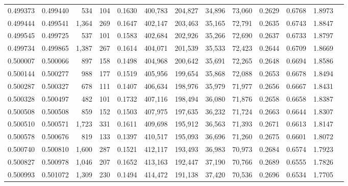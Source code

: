 \begin{tabular}{rrrrrrrrrrrrr}
0.499373 & 0.499440 &   534 &   104 &                                     0.1630 & 400,783 & 204,827 &  34,896 &  73,060 & 0.2629 & 0.6768 & 1.8973 \\
0.499444 & 0.499541 & 1,364 &   269 &                                     0.1647 & 402,147 & 203,463 &  35,165 &  72,791 & 0.2635 & 0.6743 & 1.8847 \\
0.499545 & 0.499725 &   537 &   101 &                                     0.1583 & 402,684 & 202,926 &  35,266 &  72,690 & 0.2637 & 0.6733 & 1.8797 \\
0.499734 & 0.499865 & 1,387 &   267 &                                     0.1614 & 404,071 & 201,539 &  35,533 &  72,423 & 0.2644 & 0.6709 & 1.8669 \\
0.500007 & 0.500066 &   897 &   158 &                                     0.1498 & 404,968 & 200,642 &  35,691 &  72,265 & 0.2648 & 0.6694 & 1.8586 \\
0.500144 & 0.500277 &   988 &   177 &                                     0.1519 & 405,956 & 199,654 &  35,868 &  72,088 & 0.2653 & 0.6678 & 1.8494 \\
0.500287 & 0.500327 &   678 &   111 &                                     0.1407 & 406,634 & 198,976 &  35,979 &  71,977 & 0.2656 & 0.6667 & 1.8431 \\
0.500328 & 0.500497 &   482 &   101 &                                     0.1732 & 407,116 & 198,494 &  36,080 &  71,876 & 0.2658 & 0.6658 & 1.8387 \\
0.500508 & 0.500508 &   859 &   152 &                                     0.1503 & 407,975 & 197,635 &  36,232 &  71,724 & 0.2663 & 0.6644 & 1.8307 \\
0.500510 & 0.500571 & 1,723 &   331 &                                     0.1611 & 409,698 & 195,912 &  36,563 &  71,393 & 0.2671 & 0.6613 & 1.8147 \\
0.500578 & 0.500676 &   819 &   133 &                                     0.1397 & 410,517 & 195,093 &  36,696 &  71,260 & 0.2675 & 0.6601 & 1.8072 \\
0.500740 & 0.500810 & 1,600 &   287 &                                     0.1521 & 412,117 & 193,493 &  36,983 &  70,973 & 0.2684 & 0.6574 & 1.7923 \\
0.500827 & 0.500978 & 1,046 &   207 &                                     0.1652 & 413,163 & 192,447 &  37,190 &  70,766 & 0.2689 & 0.6555 & 1.7826 \\
0.500993 & 0.501072 & 1,309 &   230 &                                     0.1494 & 414,472 & 191,138 &  37,420 &  70,536 & 0.2696 & 0.6534 & 1.7705 \\

\end{tabular}
